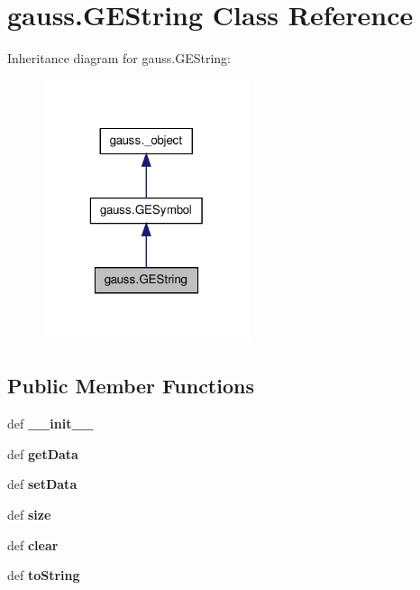 \hypertarget{classgauss_1_1_g_e_string}{\section{gauss.\-G\-E\-String Class Reference}
\label{classgauss_1_1_g_e_string}
}


Inheritance diagram for gauss.\-G\-E\-String\-:\nopagebreak
\begin{figure}[H]
\begin{center}
\leavevmode
\includegraphics[width=172pt]{classgauss_1_1_g_e_string__inherit__graph}
\end{center}
\end{figure}
\subsection*{Public Member Functions}
\begin{DoxyCompactItemize}
\item 
\hypertarget{classgauss_1_1_g_e_string_a52e02b4898112ae285a9532fa4ba6dfe}{def {\bfseries \-\_\-\-\_\-init\-\_\-\-\_\-}}\label{classgauss_1_1_g_e_string_a52e02b4898112ae285a9532fa4ba6dfe}

\item 
\hypertarget{classgauss_1_1_g_e_string_afd1b441ce67b56ab492efa2f549cf645}{def {\bfseries get\-Data}}\label{classgauss_1_1_g_e_string_afd1b441ce67b56ab492efa2f549cf645}

\item 
\hypertarget{classgauss_1_1_g_e_string_a216601462c9581a14b75c971ff732b5d}{def {\bfseries set\-Data}}\label{classgauss_1_1_g_e_string_a216601462c9581a14b75c971ff732b5d}

\item 
\hypertarget{classgauss_1_1_g_e_string_a806b65529e7d7238e94d2c3e5e6e162e}{def {\bfseries size}}\label{classgauss_1_1_g_e_string_a806b65529e7d7238e94d2c3e5e6e162e}

\item 
\hypertarget{classgauss_1_1_g_e_string_a2e2574e653042c05aa53ee9d285c0fc4}{def {\bfseries clear}}\label{classgauss_1_1_g_e_string_a2e2574e653042c05aa53ee9d285c0fc4}

\item 
\hypertarget{classgauss_1_1_g_e_string_a461c2e20092cfb7928e34bc5045e48a4}{def {\bfseries to\-String}}\label{classgauss_1_1_g_e_string_a461c2e20092cfb7928e34bc5045e48a4}

\end{DoxyCompactItemize}
